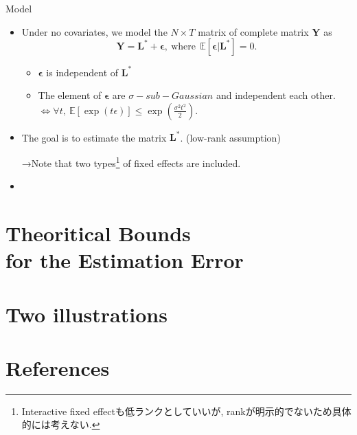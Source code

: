 \documentclass[xcolor=svgnames,aspectratio=169]{beamer}
\newcommand{\E}{\mathbb{E}}
\begin{document}
\begin{frame}{Model}
    \begin{itemize}
        \item Under no covariates, we model the $N\times T$ matrix of complete matrix $\mathbf{Y}$ as
        \[
        \mathbf{Y}=\mathbf{L^*}+\mathbf{\epsilon}, \ \text{where} \ \ \E[\mathbf{\epsilon}|\mathbf{L^*}]=0.
        \]
    \begin{tcolorbox}[colframe=lightgray,title=Assumption 1]
        \begin{itemize}
            \item $\mathbf{\epsilon}$ is independent of $\mathbf{L^*}$
            \item The element of $\mathbf{\epsilon}$ are $\sigma-sub-Gaussian$ and independent each other.
            $\Leftrightarrow \forall t, \ \E[\exp (t\epsilon)]\leq \exp (\frac{\sigma^2t^2}{2}).$
        \end{itemize}
    \end{tcolorbox}
        \item The goal is to estimate the matrix $\mathbf{L^*}$. (low-rank assumption) 
    
        →Note that two types\footnote{Interactive fixed effectも低ランクとしていいが, rankが明示的でないため具体的には考えない.} of fixed effects are included.
    \end{itemize}
\end{frame}

\begin{frame}{}
    \begin{itemize}
        \item 
    \end{itemize}
\end{frame}

\section{Theoritical Bounds \\ for the Estimation Error}

\section{Two illustrations}

\section{References}
\end{document}
